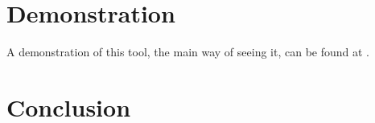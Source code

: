 \documentclass[natbib]{llncs}
\begin{document}
\subsection{}
\subsection{}
\subsection{}
\section{Demonstration}
A demonstration of this tool, the main way of seeing it, can be found at \url{}.
\section{Conclusion}
\def\href{\url}\def\path{\url}

\end{document}
